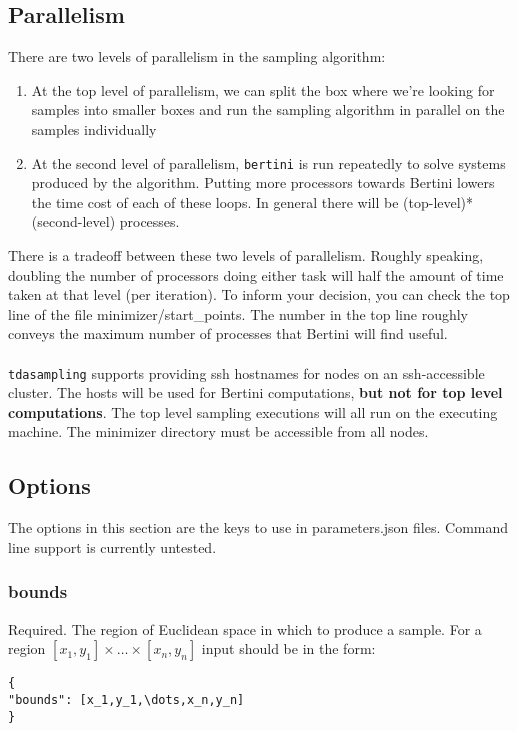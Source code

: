 \documentclass[11pt]{article}
\begin{document}
\subsection{Parallelism}
There are two levels of parallelism in the sampling algorithm: 
\begin{enumerate}
\item At the top level of parallelism, we can split the box where we're looking for samples into smaller boxes and run the sampling algorithm in parallel on the samples individually
\item At the second level of parallelism, \texttt{bertini} is run repeatedly to solve systems produced by the algorithm. Putting more processors towards Bertini lowers the time cost of each of these loops. In general there will be (top-level)*(second-level) processes. 
\end{enumerate} 

There is a tradeoff between these two levels of parallelism. Roughly speaking, doubling 
the number of processors doing either task will half the amount of time taken at that 
level (per iteration). To inform your decision, you can check the top line of the file 
minimizer/start\_points. The number in the top line roughly conveys the maximum number of 
processes that Bertini will find useful. \\ \\ 

\texttt{tdasampling} supports providing ssh hostnames for nodes on an ssh-accessible cluster. The hosts will be used for Bertini computations, {\bf but not for top level computations}. The top level sampling executions will all run on the executing machine. The minimizer directory must be accessible from all nodes. 

\subsection{Options} 
The options in this section are the keys to use in parameters.json files. Command line support is currently untested. 

\subsubsection{bounds}
Required. The region of Euclidean space in which to produce a sample. For a region $[x_1,y_1] \times\dots\times [x_n,y_n]$ input should be in the form: 
\begin{verbatim}
{
"bounds": [x_1,y_1,\dots,x_n,y_n]
}
\end{verbatim} 
\end{document}
